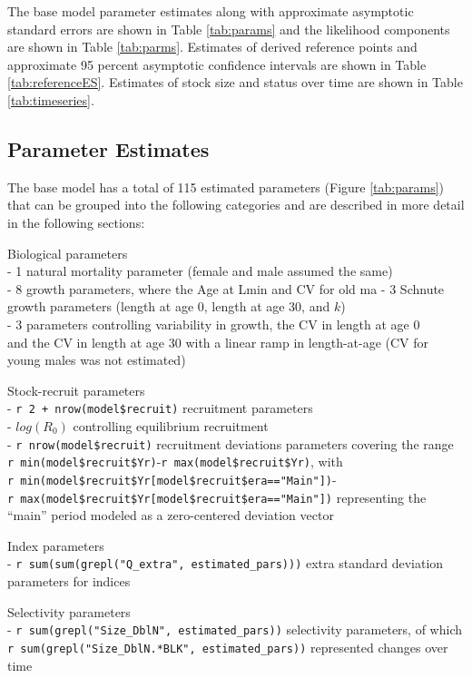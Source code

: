 \documentclass[
  english,
  a4paper,
]{article}
\begin{document}
The base model parameter estimates along with approximate asymptotic standard errors are shown in Table \ref{tab:params} and the likelihood components are shown in Table \ref{tab:parms}. Estimates of derived reference points and approximate 95 percent asymptotic confidence intervals are shown in Table \ref{tab:referenceES}. Estimates of stock size and status over time are shown in Table \ref{tab:timeseries}.

\hypertarget{parameter-estimates}{%
\subsection{Parameter Estimates}\label{parameter-estimates}}

The base model has a total of 115 estimated parameters
(Figure \ref{tab:params}) that can be grouped into the following
categories and are described in more detail in the following sections:

Biological parameters\\
- 1 natural mortality parameter (female and male assumed the same)\\
- 8 growth parameters, where the Age at Lmin and CV for old ma
- 3 Schnute growth parameters (length at age 0, length at age 30, and \(k\))\\
- 3 parameters controlling variability in growth, the CV in length at age 0\\
and the CV in length at age 30 with a linear ramp in length-at-age (CV for young males was not estimated)

Stock-recruit parameters\\
- \texttt{r\ 2\ +\ nrow(model\$recruit)} recruitment parameters\\
- \(log(R_0)\) controlling equilibrium recruitment\\
- \texttt{r\ nrow(model\$recruit)} recruitment deviations parameters covering the range\\
\texttt{r\ min(model\$recruit\$Yr)}-\texttt{r\ max(model\$recruit\$Yr)}, with
\texttt{r\ min(model\$recruit\$Yr{[}model\$recruit\$era=="Main"{]})}-\texttt{r\ max(model\$recruit\$Yr{[}model\$recruit\$era=="Main"{]})}
representing the ``main'' period modeled as a zero-centered deviation vector

Index parameters\\
- \texttt{r\ sum(sum(grepl("Q\_extra",\ estimated\_pars)))} extra standard deviation parameters
for indices

Selectivity parameters\\
- \texttt{r\ sum(grepl("Size\_DblN",\ estimated\_pars))} selectivity parameters, of which
\texttt{r\ sum(grepl("Size\_DblN.*BLK",\ estimated\_pars))} represented changes over time
\end{document}
